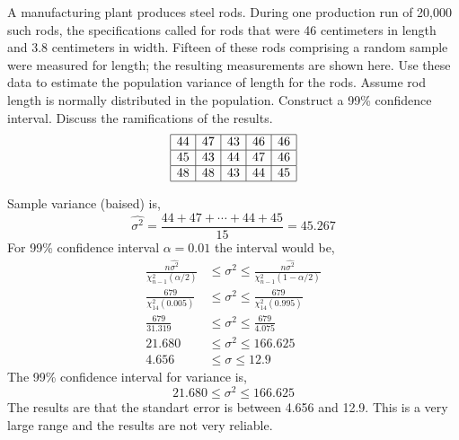 \documentclass{exam}
\theoremstyle{mytheoremstyle}
\theoremstyle{mytheoremstyle}
\theoremstyle{myproblemstyle}
\begin{document}
\begin{questions}
	\question A manufacturing plant produces steel rods. During one production run of 20,000 such rods, the specifications called for rods that were 46 centimeters in length and 3.8 centimeters in width. Fifteen of these rods comprising a random sample were measured for length; the resulting measurements are shown here. Use these data to estimate the population variance of length for the rods. Assume rod length is normally distributed in the population. Construct a 99\% confidence interval. Discuss the ramifications of the results.
	\begin{align*}
		\begin{array}{|c|c|c|c|c|}
			\hline
			44 & 47 & 43 & 46 & 46 \\\hline
			45 & 43 & 44 & 47 & 46 \\\hline
			48 & 48 & 43 & 44 & 45 \\\hline
		\end{array}
	\end{align*}
	\begin{solution}
		Sample variance (baised) is,
		\[\hat{\sigma^{2}}=\frac{44+47+\cdots+44+45}{15}=45.267\]
		For 99\% confidence interval \(\alpha=0.01\) the interval would be,
		\begin{align*}
			\frac{n\hat{\sigma^{2}}}{\chi^{2}_{n-1}(\alpha/2)} & \le \sigma^{2}\le\frac{n\hat{\sigma^{2}}}{\chi^{2}_{n-1}(1-\alpha/2)} \\
			\frac{679}{\chi^{2}_{14}(0.005)}                   & \le \sigma^{2}\le\frac{679}{\chi^{2}_{14}(0.995)}                     \\
			\frac{679}{31.319}                                 & \le \sigma^{2}\le\frac{679}{4.075}                                    \\
			21.680                                             & \le \sigma^{2}\le 166.625                                             \\
			4.656                                              & \le \sigma \le 12.9
		\end{align*}
		The 99\% confidence interval for variance is,
		\[\boxed{21.680 \le \sigma^{2}\le 166.625}\]
		The results are that the standart error is between 4.656 and 12.9. This is a very large range and the results are not very reliable.
	\end{solution}
\end{questions}
\end{document}
